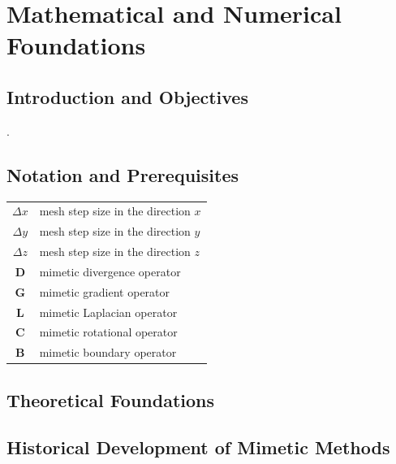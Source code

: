 \chapter{Mathematical and Numerical Foundations}

\section{Introduction and Objectives}

\cite{daVeiga2014}.

\section{Notation and Prerequisites}

\begin{table}[ht!]
	\centering
	\begin{tabular}{cl}
		$\Delta x$  & mesh step size in the direction $x$ \\
		$\Delta y$  & mesh step size in the direction $y$ \\
		$\Delta z$  & mesh step size in the direction $z$ \\
		$\symbf{D}$ & mimetic divergence operator         \\
		$\symbf{G}$ & mimetic gradient operator           \\
		$\symbf{L}$ & mimetic Laplacian operator          \\
		$\symbf{C}$ & mimetic rotational operator         \\
		$\symbf{B}$ & mimetic boundary operator
	\end{tabular}
\end{table}

\section{Theoretical Foundations}


\section{Historical Development of Mimetic Methods}


